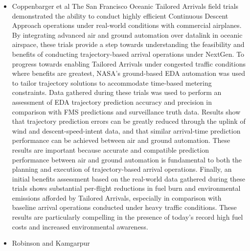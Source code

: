 \documentclass{aer1315-pretty}
\begin{document}
\begin{itemize}
\item Coppenbarger et al \cite{Copp:2007} 
    The San Francisco Oceanic Tailored Arrivals field trials demonstrated the ability to conduct highly efficient
Continuous Descent Approach operations under real-world conditions with commercial airplanes. By integrating
advanced air and ground automation over datalink in oceanic airspace, these trials provide a step towards
understanding the feasibility and benefits of conducting trajectory-based arrival operations under NextGen. To
progress towards enabling Tailored Arrivals under congested traffic conditions where benefits are greatest, NASA’s
ground-based EDA automation was used to tailor trajectory solutions to accommodate time-based metering
constraints. Data gathered during these trials was used to perform an assessment of EDA trajectory prediction
accuracy and precision in comparison with FMS predictions and surveillance truth data. Results show that trajectory
prediction errors can be greatly reduced through the uplink of wind and descent-speed-intent data, and that similar
arrival-time prediction performance can be achieved between air and ground automation. These results are important
because accurate and compatible prediction performance between air and ground automation is fundamental to both
the planning and execution of trajectory-based arrival operations.
    Finally, an initial benefits assessment based on the real-world data gathered during these trials shows substantial
per-flight reductions in fuel burn and environmental emissions afforded by Tailored Arrivals, especially in
comparison with baseline arrival operations conducted under heavy traffic conditions. These results are particularly
compelling in the presence of today’s record high fuel costs and increased environmental awareness.



\item Robinson and Kamgarpur \cite{Rob:2010} 


\end{itemize}
\end{document}
